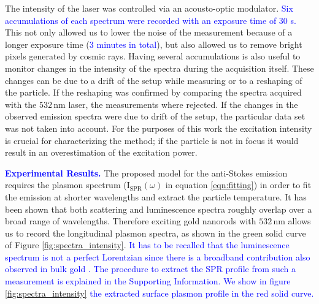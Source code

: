 \documentclass[journal=nalefd,manuscript=letter]{achemso}
\newcommand{\HI}[1]{\textcolor{blue}{#1}} %
\newcommand{\nm}{\ensuremath{\,\textrm{nm}}}
\begin{document}
The intensity of the laser was controlled via an acousto-optic modulator. 
\HI{Six accumulations of each spectrum were recorded with an exposure 
time of $30$ s.} This not only allowed us to
lower the noise of the measurement because of a longer exposure time 
(\HI{$3$ minutes in total}), but also allowed us to remove bright pixels generated by cosmic rays. 
Having several accumulations is also useful to monitor changes in the intensity of the spectra
during the acquisition itself. These changes can be due to a drift of the setup
while measuring or to a reshaping of the particle. If the reshaping was
confirmed by comparing the spectra acquired with the $532\nm$
laser\cite{Liu2009}, the measurements where rejected. If the changes in the
observed emission spectra were due to drift of the setup, the particular data
set was not taken into account. For the purposes of this work the excitation
intensity is crucial for characterizing the method; if the particle is not in
focus it would result in an overestimation of the excitation power. 



\HI{\textbf{Experimental Results.}} The proposed model for the anti-Stokes emission requires the plasmon
spectrum ($\textrm{I}_{\textrm{SPR}}(\omega)$ in equation \ref{eqn:fitting}) 
in order to fit the emission at shorter wavelengths and extract the
particle temperature. It has been shown that both scattering and luminescence
spectra roughly overlap over a broad range of wavelengths\cite{Yorulmaz2012}. Therefore
exciting gold nanorods with $532\nm$ allows us to record the longitudinal
plasmon spectra, as shown in the green solid curve of Figure \ref{fig:spectra_intensity}. 
\HI{It has to be recalled that the luminescence spectrum is not a perfect
Lorentzian since there is a broadband contribution also observed in bulk gold \cite{Mooradian1969}.
The procedure to extract the SPR profile from such a measurement is explained in the
Supporting Information. We show in figure \ref{fig:spectra_intensity} the extracted 
surface plasmon profile in the red solid curve. }
\end{document}

